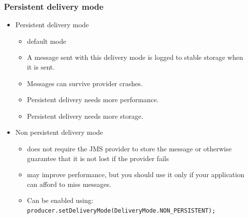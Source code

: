\documentclass[10pt,xcolor=pdflatex]{beamer}
\begin{document}
\begin{frame}[containsverbatim]\frametitle{Persistent delivery mode}
\begin{itemize}
    \item Persistent delivery mode
      \begin{itemize}
        \item default mode
        \item A message sent with this delivery mode is logged to stable storage when it is sent.
    	\item Messages can survive provider crashes.
	    \item Persistent delivery needs more performance.
    	\item Persistent delivery needs more storage.
      \end{itemize}
	\item Non persistent delivery mode
	  \begin{itemize}
	      \item does not require the JMS provider to store the message or otherwise guarantee that it is not lost if the provider fails
	      \item may improve performance, but you should use it only if your application can afford to miss messages.
	      \item Can be enabled using: \texttt{producer.setDeliveryMode(DeliveryMode.NON\_PERSISTENT);}
	  \end{itemize}
\end{itemize}
\end{frame}
\end{document}
